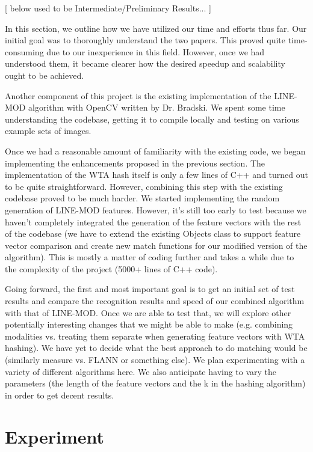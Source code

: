 \documentclass[10pt,twocolumn,letterpaper]{article}
\begin{document}
[ below used to be Intermediate/Preliminary Results... ]

In this section, we outline how we have utilized our time and efforts thus far. Our initial goal was to thoroughly understand the two papers. This proved quite time-consuming due to our inexperience in this field. However, once we had understood them, it became clearer how the desired speedup and scalability ought to be achieved.

Another component of this project is the existing implementation of the LINE-MOD algorithm with OpenCV written by Dr. Bradski. We spent some time understanding the codebase, getting it to compile locally and testing on various example sets of images.

Once we had a reasonable amount of familiarity with the existing code, we began implementing the enhancements proposed in the previous section. The implementation of the WTA hash itself is only a few lines of C++ and turned out to be quite straightforward. However, combining this step with the existing codebase proved to be much harder. We started implementing the random generation of LINE-MOD features. However, it's still too early to test because we haven't completely integrated the generation of the feature vectors with the rest of the codebase (we have to extend the existing Objects class to support feature vector comparison and create new match functions for our modified version of the algorithm). This is mostly a matter of coding further and takes a while due to the complexity of the project (5000+ lines of C++ code).

Going forward, the first and most important goal is to get an initial set of test results and compare the recognition results and speed of our combined algorithm with that of LINE-MOD. Once we are able to test that, we will explore other potentially interesting changes that we might be able to make (e.g. combining modalities vs. treating them separate when generating feature vectors with WTA hashing). We have yet to decide what the best approach to do matching would be (similarly measure vs. FLANN or something else). We plan experimenting with a variety of different algorithms here. We also anticipate having to vary the parameters (the length of the feature vectors and the k in the hashing algorithm) in order to get decent results.

\section{Experiment}
\end{document}
